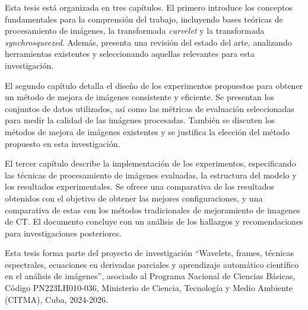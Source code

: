 Esta tesis está organizada en tres capítulos. El primero introduce los conceptos fundamentales para la comprensión del trabajo, incluyendo bases teóricas de procesamiento de imágenes, la transformada \emph{curvelet} y la transformada \emph{synchrosqueezed}. Además, presenta una revisión del estado del arte, analizando herramientas existentes y seleccionando aquellas relevantes para esta investigación.

El segundo capítulo detalla el diseño de los experimentos propuestos para obtener un método de mejora de imágenes consistente y eficiente. Se presentan los conjuntos de datos utilizados, así como las métricas de evaluación seleccionadas para medir la calidad de las imágenes procesadas. También se discuten los métodos de mejora de imágenes existentes y se justifica la elección del método propuesto en esta investigación.

El tercer capítulo describe la implementación de los experimentos, especificando las técnicas de procesamiento de imágenes evaluadas, la estructura del modelo y los resultados experimentales. Se ofrece una comparativa de los resultados obtenidos con el objetivo de obtener las mejores configuraciones, y una comparativa de estas con los métodos tradicionales de mejoramiento de imagenes de CT. El documento concluye con un análisis de los hallazgos y recomendaciones para investigaciones posteriores.

Esta tesis forma parte del proyecto de investigación ``Wavelets, frames, técnicas espectrales, ecuaciones en derivadas parciales y aprendizaje automático científico en el análisis de imágenes'', asociado al Programa Nacional de Ciencias Básicas, Código PN223LH010-036, Ministerio de Ciencia, Tecnología y Medio Ambiente (CITMA), Cuba, 2024-2026.

